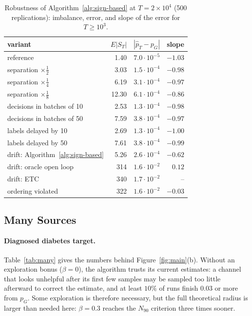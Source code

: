 \documentclass[twoside]{article}
\begin{document}
\begin{table}[!ht]
\caption{Robustness of Algorithm~\ref{alg:sign-based} at
\(T=2\times10^4\) (500 replications): imbalance, error, and slope of the
error for \(T\ge10^3\).}
\label{tab:robust}
\centering\small
\begin{tabular}{lrrr}
\hline
variant & \(E|S_T|\) & \(|\widehat p_T-p_G|\) & slope\\
\hline
reference & 1.40 & \(7.0\cdot10^{-5}\) & \(-1.03\)\\
separation \(\times\frac12\) & 3.03 & \(1.5\cdot10^{-4}\) & \(-0.98\)\\
separation \(\times\frac14\) & 6.19 & \(3.1\cdot10^{-4}\) & \(-0.97\)\\
separation \(\times\frac18\) & 12.30 & \(6.1\cdot10^{-4}\) & \(-0.86\)\\
decisions in batches of 10 & 2.53 & \(1.3\cdot10^{-4}\) & \(-0.98\)\\
decisions in batches of 50 & 7.59 & \(3.8\cdot10^{-4}\) & \(-0.97\)\\
labels delayed by 10 & 2.69 & \(1.3\cdot10^{-4}\) & \(-1.00\)\\
labels delayed by 50 & 7.61 & \(3.8\cdot10^{-4}\) & \(-0.99\)\\
drift: Algorithm~\ref{alg:sign-based} & 5.26 & \(2.6\cdot10^{-4}\) & \(-0.62\)\\
drift: oracle open loop & 314 & \(1.6\cdot10^{-2}\) & \(0.12\)\\
drift: ETC & 340 & \(1.7\cdot10^{-2}\) & --\\
ordering violated & 322 & \(1.6\cdot10^{-2}\) & \(-0.03\)\\
\hline
\end{tabular}
\end{table}

\FloatBarrier
\subsection{Many Sources}
\label{app:exp-many}

\paragraph{Diagnosed diabetes target.} Table~\ref{tab:many} gives the numbers behind
Figure~\ref{fig:main}(b). Without an exploration bonus (\(\beta=0\)), the
algorithm trusts its current estimates: a channel that looks unhelpful after
its first few samples may be sampled too little afterward to correct the
estimate, and at least \(10\%\) of runs finish \(0.03\) or more from
\(p_G\). Some exploration is therefore necessary, but the full theoretical
radius is larger than needed here: \(\beta=0.3\) reaches the
\(N_{90}\) criterion three times sooner.
\end{document}
